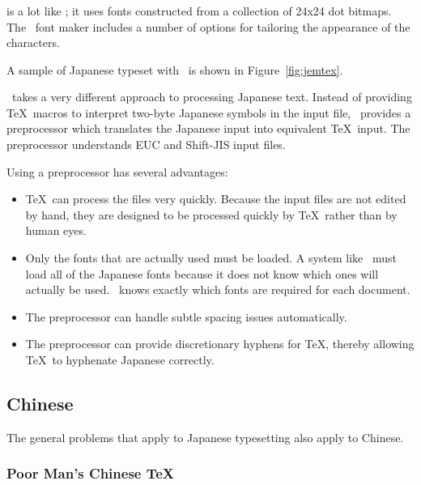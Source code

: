 \subsubsection{\jemtex}

 is a 
lot like \pmj; it uses fonts constructed from a collection of
24x24 dot bitmaps.  The \jemtex\ font maker includes a number of options for
tailoring the appearance of the characters.

A sample of Japanese typeset with \jemtex\ is shown in 
Figure~\ref{fig:jemtex}.


\jemtex\ takes a very different approach to processing Japanese text.
Instead of providing \TeX\ macros to interpret two-byte Japanese symbols
in the input file, \jemtex\ provides a preprocessor which translates
the Japanese input into equivalent \TeX\ input. The preprocessor understands
EUC and Shift-JIS input files.  

Using a preprocessor has
several advantages:

\begin{itemize}
  \item \TeX\ can process the files very quickly.  Because the input files
        are not edited by hand, they are designed to be processed quickly
        by \TeX\ rather than by human eyes.
  \item Only the fonts that are actually used must be loaded.  A system
        like \pmj\ must load all of the Japanese fonts because it does not
        know which ones will actually be used.  \jemtex\ knows exactly
        which fonts are required for each document.
  \item The preprocessor can handle subtle spacing issues automatically.
  \item The preprocessor can provide discretionary hyphens for \TeX, thereby
        allowing \TeX\ to hyphenate Japanese correctly.
\end{itemize}

\subsection{Chinese}

The general problems that apply to Japanese typesetting also apply to Chinese.

\subsubsection{Poor Man's Chinese \protect\TeX}

